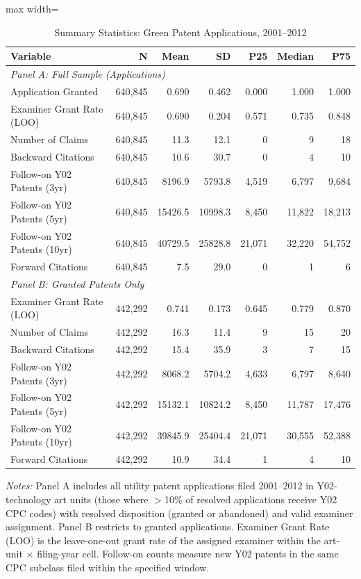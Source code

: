 \begin{table}[htbp]
\centering
\caption{Summary Statistics: Green Patent Applications, 2001--2012}
\label{tab:summary}
\begin{adjustbox}{max width=\textwidth}
\begin{tabular}{lrrrrrr}
\hline\hline
Variable & N & Mean & SD & P25 & Median & P75 \\
\hline
\multicolumn{7}{l}{\textit{Panel A: Full Sample (Applications)}} \\
Application Granted & 640,845 & 0.690 & 0.462 & 0.000 & 1.000 & 1.000 \\
Examiner Grant Rate (LOO) & 640,845 & 0.690 & 0.204 & 0.571 & 0.735 & 0.848 \\
Number of Claims & 640,845 & 11.3 & 12.1 & 0 & 9 & 18 \\
Backward Citations & 640,845 & 10.6 & 30.7 & 0 & 4 & 10 \\
Follow-on Y02 Patents (3yr) & 640,845 & 8196.9 & 5793.8 & 4,519 & 6,797 & 9,684 \\
Follow-on Y02 Patents (5yr) & 640,845 & 15426.5 & 10998.3 & 8,450 & 11,822 & 18,213 \\
Follow-on Y02 Patents (10yr) & 640,845 & 40729.5 & 25828.8 & 21,071 & 32,220 & 54,752 \\
Forward Citations & 640,845 & 7.5 & 29.0 & 0 & 1 & 6 \\
\hline
\multicolumn{7}{l}{\textit{Panel B: Granted Patents Only}} \\
Examiner Grant Rate (LOO) & 442,292 & 0.741 & 0.173 & 0.645 & 0.779 & 0.870 \\
Number of Claims & 442,292 & 16.3 & 11.4 & 9 & 15 & 20 \\
Backward Citations & 442,292 & 15.4 & 35.9 & 3 & 7 & 15 \\
Follow-on Y02 Patents (3yr) & 442,292 & 8068.2 & 5704.2 & 4,633 & 6,797 & 8,640 \\
Follow-on Y02 Patents (5yr) & 442,292 & 15132.1 & 10824.2 & 8,450 & 11,787 & 17,476 \\
Follow-on Y02 Patents (10yr) & 442,292 & 39845.9 & 25404.4 & 21,071 & 30,555 & 52,388 \\
Forward Citations & 442,292 & 10.9 & 34.4 & 1 & 4 & 10 \\
\hline\hline
\end{tabular}
\end{adjustbox}
\begin{minipage}{0.95\textwidth}
\footnotesize
\textit{Notes:} Panel A includes all utility patent applications filed 2001--2012 in Y02-technology art units (those where $>$10\% of resolved applications receive Y02 CPC codes) with resolved disposition (granted or abandoned) and valid examiner assignment. Panel B restricts to granted applications. Examiner Grant Rate (LOO) is the leave-one-out grant rate of the assigned examiner within the art-unit $\times$ filing-year cell. Follow-on counts measure new Y02 patents in the same CPC subclass filed within the specified window.
\end{minipage}
\end{table}
